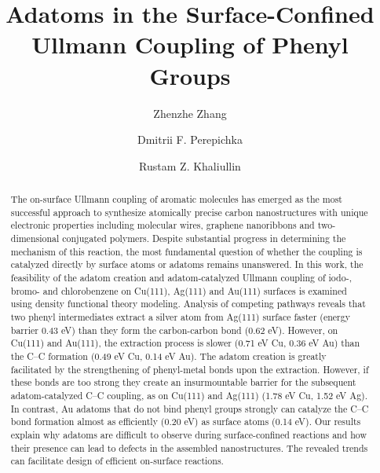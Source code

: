 \documentclass[aps,prb,amsmath,amssymb,11pt]{revtex4-1}
\begin{document}
\title
{Adatoms in the Surface-Confined Ullmann Coupling of Phenyl Groups}

\author{Zhenzhe Zhang}
\author{Dmitrii F. Perepichka}%
\author{Rustam Z. Khaliullin}
%


\begin{abstract}
The on-surface Ullmann coupling of aromatic molecules has emerged as the most successful approach to synthesize atomically precise carbon nanostructures with unique electronic properties including molecular wires, graphene nanoribbons and two-dimensional conjugated polymers. Despite substantial progress in determining the mechanism of this reaction, the most fundamental question of whether the coupling is catalyzed directly by surface atoms or adatoms remains unanswered. In this work, the feasibility of the adatom creation and adatom-catalyzed Ullmann coupling of  iodo-, bromo- and chlorobenzene on Cu(111), Ag(111) and Au(111) surfaces is examined using density functional theory modeling. Analysis of competing pathways reveals that two phenyl intermediates extract a silver atom from Ag(111) surface faster (energy barrier 0.43 eV) than they form the carbon-carbon bond (0.62 eV). However, on Cu(111) and Au(111), the extraction process is slower (0.71 eV Cu, 0.36 eV Au) than the C--C formation (0.49 eV Cu, 0.14 eV Au). The adatom creation is greatly facilitated by the strengthening of phenyl-metal bonds upon the extraction. However, if these bonds are too strong they create an insurmountable barrier for the subsequent adatom-catalyzed C--C coupling, as on Cu(111) and Ag(111) (1.78 eV Cu, 1.52 eV Ag). In contrast, Au adatoms that do not bind phenyl groups strongly can catalyze the C--C bond formation almost as efficiently (0.20 eV) as surface atoms (0.14 eV). Our results explain why adatoms are difficult to observe during surface-confined reactions and how their presence can lead to defects in the assembled nanostructures. The revealed trends can facilitate design of efficient on-surface reactions.


\end{abstract}
\end{document}
